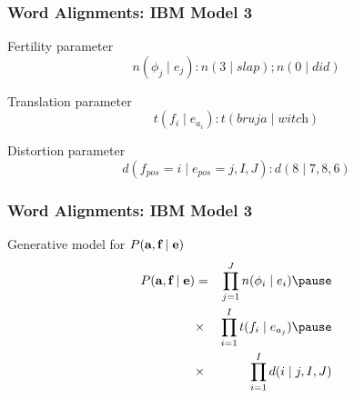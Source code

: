 \begin{frame}
\frametitle{Word Alignments: IBM Model 3}
\begin{block}{Fertility parameter}
\[ n(\phi_j \mid e_j) : n(3 \mid \textit{slap}) ; n(0 \mid \textit{did}) \]
\end{block}\pause
\begin{block}{Translation parameter}
\[ t(f_i \mid e_{a_i}) : t(\textit{bruja} \mid \textit{witch}) \]
\end{block}\pause
\begin{block}{Distortion parameter}
\[ d(f_{\textit{pos}} = i \mid e_{\textit{pos}} = j, I, J) : d(8 \mid 7, 8, 6) \]
\end{block}
\end{frame}

\begin{frame}
\frametitle{Word Alignments: IBM Model 3}
\begin{block}{Generative model for $P(\textbf{a}, \textbf{f} \mid \textbf{e})$}
\begin{eqnarray*}
P(\aln, \src \mid \tgt) & = & \prod_{j=1}^J n(\phi_i \mid e_i)  \pause\\
& \times & \prod_{i=1}^I t(f_i \mid e_{a_j}) \pause\\
& \times & \prod_{i=1}^I d(i \mid j, I, J)
\end{eqnarray*}
\end{block}
\end{frame}

